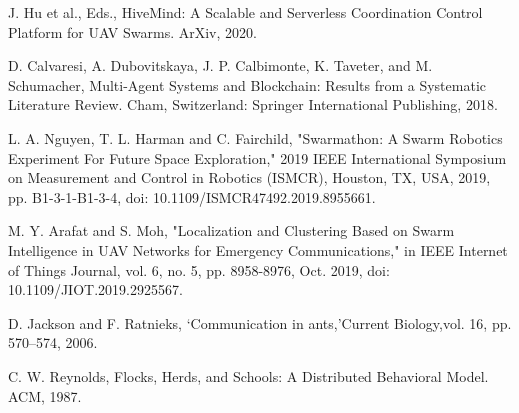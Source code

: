 \documentclass{UoYCSproject}
\begin{document}
\begin{thebibliography}{100}
J. Hu et al., Eds., HiveMind: A Scalable and Serverless Coordination Control Platform for UAV Swarms. ArXiv, 2020.

D. Calvaresi, A. Dubovitskaya, J. P. Calbimonte, K. Taveter, and M. Schumacher, Multi-Agent Systems and Blockchain: Results from a Systematic Literature Review. Cham, Switzerland: Springer International Publishing, 2018.

L. A. Nguyen, T. L. Harman and C. Fairchild, "Swarmathon: A Swarm Robotics Experiment For Future Space Exploration," 2019 IEEE International Symposium on Measurement and Control in Robotics (ISMCR), Houston, TX, USA, 2019, pp. B1-3-1-B1-3-4, doi: 10.1109/ISMCR47492.2019.8955661.

M. Y. Arafat and S. Moh, "Localization and Clustering Based on Swarm Intelligence in UAV Networks for Emergency Communications," in IEEE Internet of Things Journal, vol. 6, no. 5, pp. 8958-8976, Oct. 2019, doi: 10.1109/JIOT.2019.2925567.

D. Jackson and F. Ratnieks, ‘Communication in ants,’Current Biology,vol. 16, pp. 570–574, 2006.

C. W. Reynolds, Flocks, Herds, and Schools: A Distributed Behavioral Model. ACM, 1987.

\end{thebibliography}
\end{document}
